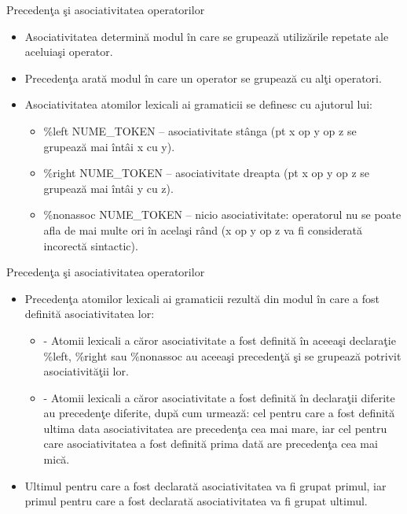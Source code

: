 \documentclass[pdf]{beamer}
\begin{document}
\begin{frame}{Precedenţa şi asociativitatea operatorilor}
\begin{itemize}
	\item
	Asociativitatea determină modul în care se grupează utilizările repetate ale aceluiaşi operator.

	\item
	Precedenţa arată modul în care un operator se grupează cu alţi operatori.

	\item
	Asociativitatea atomilor lexicali ai gramaticii se definesc cu ajutorul lui:

	\begin{itemize}
		\item<cir@1->
		{\color{red}\%left NUME\_TOKEN} – asociativitate stânga (pt x op y op z se grupează mai întâi x cu y).

		\item<cir@1->
		{\color{red}\%right NUME\_TOKEN} – asociativitate dreapta (pt x op y op z se grupează mai întâi y cu z).
	
		\item<cir@1->
		{\color{red}\%nonassoc NUME\_TOKEN} – nicio asociativitate: operatorul nu se poate afla de mai multe ori în acelaşi rând (x op y op z va fi considerată incorectă sintactic).

	\end{itemize}	

\end{itemize}
\end{frame}



\begin{frame}{Precedenţa şi asociativitatea operatorilor}
\begin{itemize}
	\item
	Precedenţa atomilor lexicali ai gramaticii rezultă din modul în care a fost definită asociativitatea lor:

	\begin{itemize}
		\item[]
		- Atomii lexicali a căror asociativitate a fost definită în aceeaşi declaraţie \%left, \%right sau \%nonassoc au aceeaşi precedenţă şi se grupează potrivit asociativităţii lor.
	
		\item[]
		- Atomii lexicali a căror asociativitate a fost definită în declaraţii diferite au precedenţe diferite, după cum urmează: cel pentru care a fost definită ultima data asociativitatea are precedenţa cea mai mare, iar cel pentru care asociativitatea a fost definită prima dată are precedenţa cea mai mică.
	\end{itemize}

	\item
	Ultimul pentru care a fost declarată asociativitatea va fi grupat primul, iar primul pentru care a fost declarată asociativitatea va fi grupat ultimul.

\end{itemize}
\end{frame}
\end{document}
